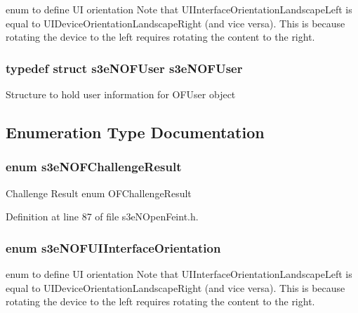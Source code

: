 enum to define UI orientation Note that UIInterfaceOrientationLandscapeLeft is equal to UIDeviceOrientationLandscapeRight (and vice versa). This is because rotating the device to the left requires rotating the content to the right. \hypertarget{group___n_open_feint_api_group_ga038694687b332e497536920f13f4b0f3}{
\subsubsection[{s3eNOFUser}]{\setlength{\rightskip}{0pt plus 5cm}typedef struct {\bf s3eNOFUser}  {\bf s3eNOFUser}}}
\label{group___n_open_feint_api_group_ga038694687b332e497536920f13f4b0f3}
Structure to hold user information for OFUser object 

\subsection{Enumeration Type Documentation}
\hypertarget{group___n_open_feint_api_group_ga954444cdbeafa2947e969f78ed1e29f4}{
\subsubsection[{s3eNOFChallengeResult}]{\setlength{\rightskip}{0pt plus 5cm}enum {\bf s3eNOFChallengeResult}}}
\label{group___n_open_feint_api_group_ga954444cdbeafa2947e969f78ed1e29f4}
Challenge Result enum OFChallengeResult 

Definition at line 87 of file s3eNOpenFeint.h.

\hypertarget{group___n_open_feint_api_group_gac32b01451990bbfa1b6e2fe38e01262b}{
\subsubsection[{s3eNOFUIInterfaceOrientation}]{\setlength{\rightskip}{0pt plus 5cm}enum {\bf s3eNOFUIInterfaceOrientation}}}
\label{group___n_open_feint_api_group_gac32b01451990bbfa1b6e2fe38e01262b}
enum to define UI orientation Note that UIInterfaceOrientationLandscapeLeft is equal to UIDeviceOrientationLandscapeRight (and vice versa). This is because rotating the device to the left requires rotating the content to the right. 

